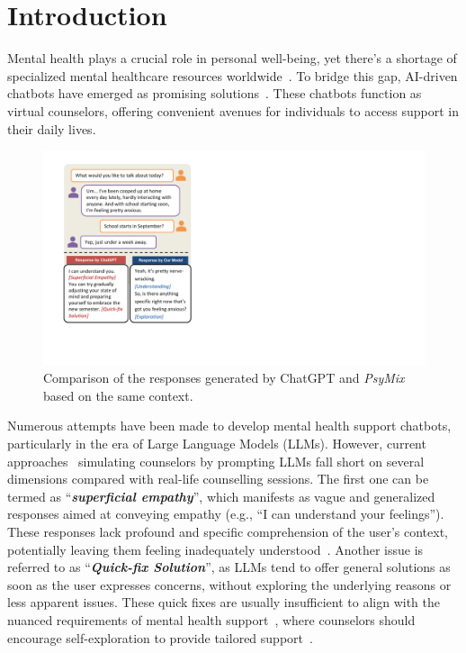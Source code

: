 \section{Introduction}
\label{sec:intro}
Mental health plays a crucial role in personal well-being, yet there's a shortage of specialized mental healthcare resources worldwide~\cite{Sharma_Choudhury_Althoff_Sharma_2020}. To bridge this gap, AI-driven chatbots have emerged as promising solutions~\cite{welivita-pu-2023-boosting}. These chatbots function as virtual counselors, offering convenient avenues for individuals to access support in their daily lives. 


\begin{figure}[th]
	\centering
	\includegraphics[width=0.8\linewidth]{figures/overview.pdf}
	\caption{Comparison of the responses generated by ChatGPT and \textit{PsyMix} based on the same context.}
	\label{fig:overview}
\end{figure}

Numerous attempts have been made to develop mental health support chatbots, particularly in the era of Large Language Models (LLMs). However, current approaches~\cite{Qiu2023SMILEST, loh2023harnessing, Chen2023LLMempoweredCF} simulating counselors by prompting LLMs fall short on several dimensions compared with real-life counselling sessions.
The first one can be termed as ``\textit{\textbf{superficial empathy}}'', which manifests as vague and generalized responses aimed at conveying empathy (e.g., ``I can understand your feelings''). These responses lack profound and specific comprehension of the user's context, potentially leaving them feeling inadequately understood~\cite{lee-etal-2023-empathy, Sharma2021Empathy}.
Another issue is referred to as ``\textit{\textbf{Quick-fix Solution}}'', as LLMs tend to offer general solutions as soon as the user expresses concerns, without exploring the underlying reasons or less apparent issues. These quick fixes are usually insufficient to align with the nuanced requirements of mental health support~\cite{Sharma_Choudhury_Althoff_Sharma_2020}, where counselors should encourage self-exploration to provide tailored support~\cite{lahnala-etal-2022-critical}.

